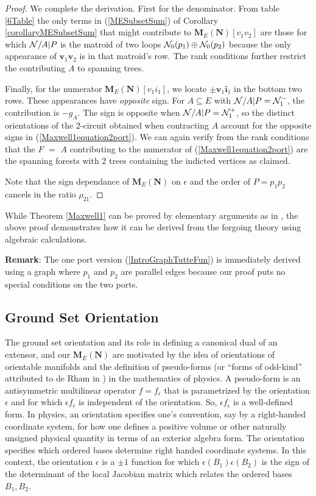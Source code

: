 \documentclass[12pt]{article}
\theoremstyle{definition}
\newcommand{\Remark}{\textbf{Remark}}
\newcommand{\ext}[1]{\ensuremath{\mathbf{#1}}}
\begin{document}
\begin{proof}
We complete the derivation.
First for the denominator.
From table \ref{6Table} the only terms in 
(\ref{MESubsetSum}) of Corollary \ref{corollaryMESubsetSum} 
that might contribute to 
$\ext{M}_E(\ext{N})[v_1v_2]$ are those for which $\mathcal{N}/A|P$ is the matroid
of two loops $\mathcal{N}_0(p_1)\oplus \mathcal{N}_0(p_2)$ because the only appearance
of $\ext{v}_1\ext{v}_2$ is in that matroid's row.  The rank conditions further
restrict the contributing $A$ to spanning trees.

Finally, for the numerator $\ext{M}_E(\ext{N})[v_1i_1]$, we locate 
$\pm \ext{v}_1\ext{i}_1$ in the bottom two rows.
These appearances have \textit{opposite} sign.
For $A\subseteq E$ with $\mathcal{N}/A|P=\mathcal{N}_1^-$, the contribution
is $-g_A$.  
The sign is opposite
when $\mathcal{N}/A|P=\mathcal{N}_1^+$, so the distinct orientations of the 2-circuit
obtained when contracting $A$ account for the opposite signs
in (\ref{Maxwell1equation2port}).  We can again verify from the rank
conditions that the $F$ $=$ $A$ contributing to the numerator of 
(\ref{Maxwell1equation2port}) are the spanning forests with 2 trees
containing the indicted vertices as claimed.

Note that the sign dependance of $\ext{M}_E(\ext{N})$ on $\epsilon$ and
the order of $P=p_1p_2$ cancels in the ratio $\rho_{21}$.
\end{proof}

While Theorem \ref{Maxwell1} can be proved by elementary arguments as in
\cite{ChensBook}, the above proof demonstrates how it can be derived
from the forgoing theory using algebraic calculations.

\Remark: The one port version (\textsection \ref{IntroGraphTutteFun})
is immediately derived using a graph where 
$p_1$ and $p_2$ are parallel edges because our proof puts no
special conditions on the two ports.

\subsection{Ground Set Orientation}
\label{GroundSetOrientationBack}

The ground set orientation
and its role in defining a
canonical dual of an extensor, and our $\ext{M}_E(\ext{N})$ are motivated by
the idea of orientations of orientable manifolds and the definition
of pseudo-forms (or ``forms of odd-kind'' attributed to de Rham in
\cite{Frankel}) in the mathematics of physics.  A pseudo-form
is an antisymmetric multilinear operator $f=f_\epsilon$
that is parametrized by the orientation $\epsilon$ and for which
$\epsilon f_\epsilon$ is independent of the orientation\cite{Frankel}.
So, $\epsilon f_\epsilon$ is a well-defined 
form.  In physics, an orientation
specifies one's convention, say by a right-handed coordinate system, 
for how one defines
a positive volume or other naturally unsigned physical quantity
in terms of an exterior algebra form.  The orientation specifies
which ordered bases determine right handed coordinate systems.
In this context, the orientation $\epsilon$ is a $\pm 1$ function 
for which 
$\epsilon(B_1)\epsilon(B_2)$
is the sign of the determinant of the local Jacobian 
matrix which relates the ordered bases $B_1,B_2$.  
\end{document}
